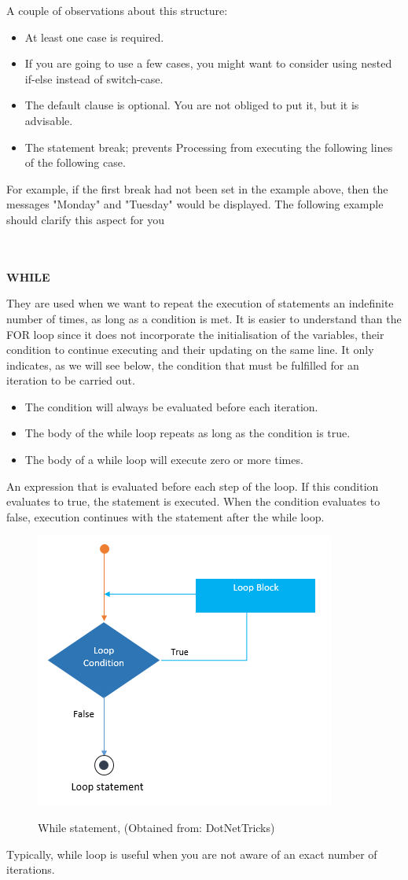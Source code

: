 \documentclass[11pt, letterpaper, english]{article}
\begin{document}
\par{A couple of observations about this structure:
\begin{itemize}
\item At least one case is required.
\item If you are going to use a few cases, you might want to consider using nested if-else instead of switch-case.
\item The default clause is optional. You are not obliged to put it, but it is advisable.
\item The statement break; prevents Processing from executing the following lines of the following case.
\end{itemize}
\par{For example, if the first break had not been set in the example above, then the messages "Monday" and "Tuesday" would be displayed. The following example should clarify this aspect for you}}\\ \\
\textbf{WHILE}
\par{They are used when we want to repeat the execution of statements an indefinite number of times, as long as a condition is met. It is easier to understand than the FOR loop since it does not incorporate the initialisation of the variables, their condition to continue executing and their updating on the same line. It only indicates, as we will see below, the condition that must be fulfilled for an iteration to be carried out.}\\
   \begin{itemize}
       \item The condition will always be evaluated before each iteration.
       \item The body of the while loop repeats as long as the condition is true.
       \item The body of a while loop will execute zero or more times.
   \end{itemize}
   \par{An expression that is evaluated before each step of the loop. If this condition evaluates to true, the statement is executed. When the condition evaluates to false, execution continues with the statement after the while loop.} \\
   
   \begin{figure}
	    \centering
		\caption{While statement, (Obtained from: {DotNetTricks})}
		\includegraphics[width=0.2 \textwidth]{cloop.png}
		\label{Imagen_while}
	\end{figure}
	\par{Typically, while loop is useful when you are not aware of an exact number of iterations.}\\
	
\end{document}
